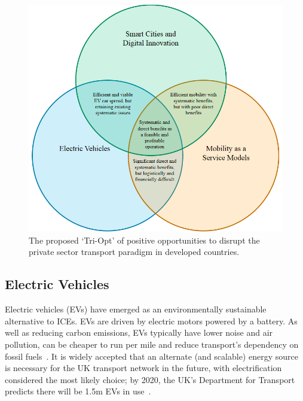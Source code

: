 \documentclass[journal]{IEEEtran}
\begin{document}
\begin{figure}[htb]
\centering
\includegraphics[width=\columnwidth]{images/triopt.png}
\caption{The proposed `Tri-Opt' of positive opportunities to disrupt
  the private sector transport paradigm in developed countries.}
\label{fig:triopt}
\end{figure}



\subsection{Electric Vehicles}

Electric vehicles (EVs) have emerged as an environmentally sustainable
alternative to ICEs. EVs are driven by electric motors powered by a
battery. As well as reducing carbon emissions, EVs typically have
lower noise and air pollution, can be cheaper to run per mile and
reduce transport's dependency on fossil fuels~\cite{postevs:2010}. It
is widely accepted that an alternate (and scalable) energy source is
necessary for the UK transport network in the future, with
electrification considered the most likely choice; by 2020, the UK's
Department for Transport predicts there will be 1.5m EVs in
use~\cite{dft:2008}.
\end{document}

